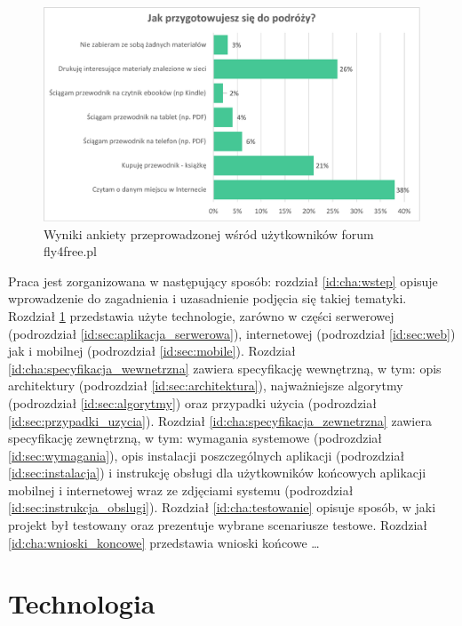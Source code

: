 \documentclass[a4paper]{book}
\begin{document}
			\begin{figure}		
				\centering
				\includegraphics[width=1.0\textwidth]{images/fly4freeAnkieta.pdf}
				\caption{Wyniki ankiety przeprowadzonej wśród użytkowników forum fly4free.pl}
				\label{fig:fly4freeAnkieta}
			\end{figure}
		
	        Praca jest zorganizowana w następujący sposób: 	        
			rozdział \ref{id:cha:wstep} opisuje wprowadzenie do zagadnienia i uzasadnienie podjęcia się takiej tematyki. 
			Rozdział \ref{id:cha:technologia} przedstawia użyte technologie, zarówno w części serwerowej (podrozdział \ref{id:sec:aplikacja_serwerowa}), internetowej (podrozdział \ref{id:sec:web}) jak i mobilnej (podrozdział \ref{id:sec:mobile}). 
			Rozdział \ref{id:cha:specyfikacja_wewnetrzna} zawiera specyfikację wewnętrzną, w tym: opis architektury (podrozdział \ref{id:sec:architektura}), najważniejsze algorytmy (podrozdział \ref{id:sec:algorytmy}) oraz przypadki użycia (podrozdział \ref{id:sec:przypadki_uzycia}). 
			Rozdział \ref{id:cha:specyfikacja_zewnetrzna} zawiera specyfikację zewnętrzną, w tym: wymagania systemowe (podrozdział \ref{id:sec:wymagania}), opis instalacji poszczególnych aplikacji (podrozdział \ref{id:sec:instalacja}) i instrukcję obsługi dla użytkowników końcowych aplikacji mobilnej i internetowej wraz ze zdjęciami systemu (podrozdział \ref{id:sec:instrukcja_obslugi}).
			Rozdział \ref{id:cha:testowanie} opisuje sposób, w jaki projekt był testowany oraz prezentuje wybrane scenariusze testowe. 
			Rozdział \ref{id:cha:wnioski_koncowe} przedstawia wnioski końcowe \ldots				
	
	
	
	\chapter{Technologia}
	\label{id:cha:technologia}
	
\end{document}
